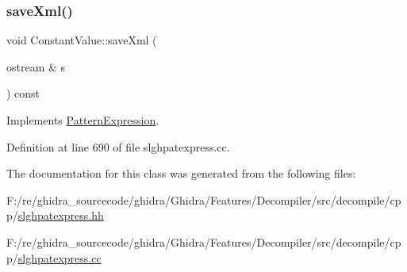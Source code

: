 \mbox{\label{class_constant_value_a03712496f11e48e4b860d10e20dca2e2}} 
\subsubsection{\texorpdfstring{saveXml()}{saveXml()}}
{\footnotesize\ttfamily void Constant\+Value\+::save\+Xml (\begin{DoxyParamCaption}\item[{ostream \&}]{s }\end{DoxyParamCaption}) const\hspace{0.3cm}{\ttfamily [virtual]}}



Implements \mbox{\hyperlink{class_pattern_expression_a0d9c89ffbf4a22fac68189a845cde92a}{Pattern\+Expression}}.



Definition at line 690 of file slghpatexpress.\+cc.



The documentation for this class was generated from the following files\+:\begin{DoxyCompactItemize}
\item 
F\+:/re/ghidra\+\_\+sourcecode/ghidra/\+Ghidra/\+Features/\+Decompiler/src/decompile/cpp/\mbox{\hyperlink{slghpatexpress_8hh}{slghpatexpress.\+hh}}\item 
F\+:/re/ghidra\+\_\+sourcecode/ghidra/\+Ghidra/\+Features/\+Decompiler/src/decompile/cpp/\mbox{\hyperlink{slghpatexpress_8cc}{slghpatexpress.\+cc}}\end{DoxyCompactItemize}
